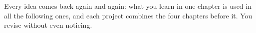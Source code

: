 

\vspace{4mm}
\begin{astuce}
Every idea comes back again and again: what you learn in one chapter is used in all the following
ones, and each project combines the four chapters before it. You revise without even noticing.
\end{astuce}
